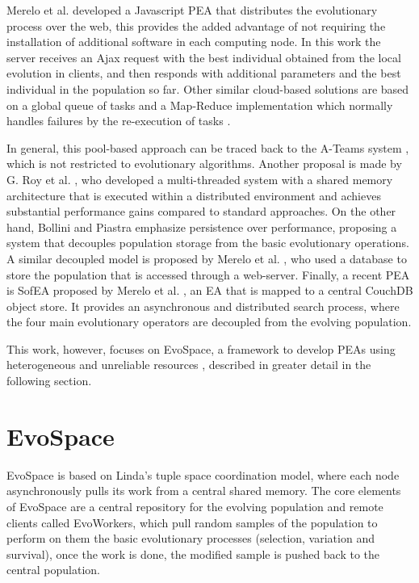 \documentclass{sig-alternate}
\begin{document}
Merelo et al. \cite{JSON} developed a Javascript PEA that distributes the evolutionary process over the web,
this provides the added advantage of not requiring the installation of additional software in each computing node. 
In this work the server receives an Ajax request with the best individual 
obtained from the local evolution in clients, and then responds with 
additional parameters and the best individual in the population so far. 
Other similar cloud-based solutions are based on a global queue of tasks and a Map-Reduce 
implementation which normally handles failures by the re-execution of  tasks \cite{fazenda2012,di2013towards,FlexGP}. 



In general, this pool-based approach can be traced back to the A-Teams system \cite{ateam}, which is not restricted to evolutionary algorithms.
Another proposal is made by G. Roy et al. \cite{roy:2009}, who developed a multi-threaded system with a shared memory architecture that is
executed within a distributed environment and achieves substantial performance gains compared to standard approaches. On the other hand, Bollini and Piastra \cite{bollini:1999} emphasize persistence over performance, proposing a system that decouples population storage from the basic evolutionary operations. A similar decoupled model is proposed by Merelo et al. \cite{merelo:2008}, who used a database to store the population that is accessed through a web-server. Finally, a recent PEA is SofEA proposed by Merelo et al. \cite{sofea1,sofea2},
an EA that is mapped to a central CouchDB object store. It provides an asynchronous and distributed search process, where the four main evolutionary operators are decoupled from the evolving population.

This work, however, focuses on EvoSpace, a framework to develop PEAs using heterogeneous and unreliable resources \cite{Evospace,Musart,FreeLunch,Fire}, described in greater
detail in the following section.
 
\section{EvoSpace}
\label{sec:evo}
EvoSpace is based on Linda's tuple space \cite{Evospace} coordination model, where each node asynchronously
pulls its work from a central shared memory. The core elements of EvoSpace are a central 
repository for the evolving population and remote clients called EvoWorkers,
which pull random samples of the population to perform on them the basic evolutionary
processes (selection, variation and survival), once the work is done, the modified sample is pushed back to the central population.
\end{document}
